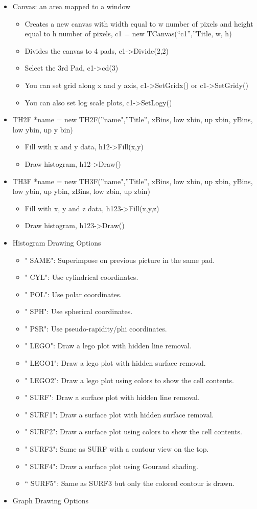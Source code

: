 \documentclass[11pt]{article}
\begin{document}
\begin{itemize}
\item Canvas: an area mapped to a window
\begin{itemize}
\item Creates a new canvas with width equal to w number of pixels and height equal to h number of pixels, c1 = new TCanvas(“c1”,”Title, w, h)
\item Divides the canvas to 4 pads, c1->Divide(2,2)
\item Select the 3rd Pad, c1->cd(3)
\item You can set grid along x and y axis, c1->SetGridx() or c1->SetGridy()
\item You can also set log scale plots, c1->SetLogy()
\end{itemize}
\item TH2F *name = new TH2F(”name",”Title”, xBins, low xbin, up xbin, yBins, low ybin, up y bin)
\begin{itemize}
\item Fill with x and y data, h12->Fill(x,y)
\item Draw histogram, h12->Draw()
\end{itemize}
\item TH3F *name = new TH3F(”name",”Title”, xBins, low xbin, up xbin, yBins, low ybin, up ybin, zBins, low zbin, up zbin)
\begin{itemize}
\item Fill with x, y and z data, h123->Fill(x,y,z)
\item Draw histogram, h123->Draw()
\end{itemize}
\item Histogram Drawing Options
\begin{itemize}
\item " SAME": Superimpose on previous picture in the same pad.
\item " CYL": Use cylindrical coordinates.
\item " POL": Use polar coordinates.
\item " SPH": Use spherical coordinates.
\item " PSR": Use pseudo-rapidity/phi coordinates.
\item " LEGO": Draw a lego plot with hidden line removal.
\item " LEGO1": Draw a lego plot with hidden surface removal.
\item " LEGO2": Draw a lego plot using colors to show the cell contents.
\item " SURF": Draw a surface plot with hidden line removal.
\item " SURF1": Draw a surface plot with hidden surface removal.
\item " SURF2": Draw a surface plot using colors to show the cell contents.
\item " SURF3": Same as SURF with a contour view on the top.
\item " SURF4": Draw a surface plot using Gouraud shading.
\item “ SURF5”: Same as SURF3 but only the colored contour is drawn.
\end{itemize}
\item Graph Drawing Options
\end{itemize}
\end{document}
